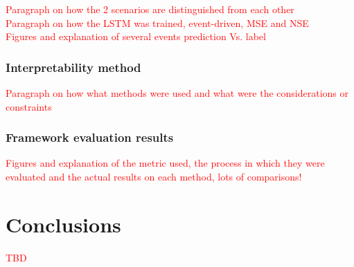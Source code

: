 \documentclass[12pt]{report}
\begin{document}
\textcolor{red}{Paragraph on how the 2 scenarios are distinguished from each other }\\

\textcolor{red}{Paragraph on how the LSTM was trained, event-driven, MSE and NSE}\\

\textcolor{red}{Figures and explanation of several events prediction Vs. label}\\
\subsection{Interpretability method}

\textcolor{red}{Paragraph on how what methods were used and what were the considerations or constraints}\\

\subsection{Framework evaluation results}
\textcolor{red}{Figures and explanation of the metric used, the process in which they were evaluated and the actual results on each method, lots of comparisons!}\\

\chapter{Conclusions} 
\textcolor{red}{TBD}\\

\newpage
	

\printbibliography
\end{document}
